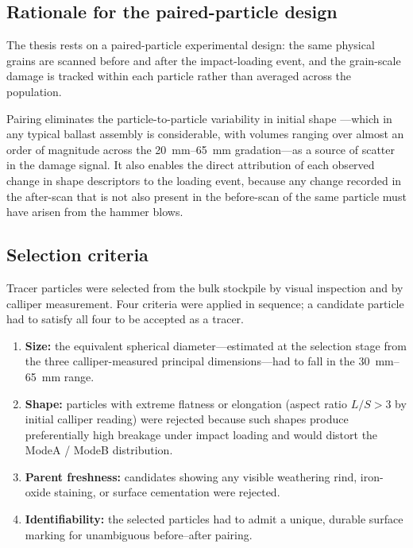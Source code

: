 \subsection{Rationale for the paired-particle design}
\label{sec:meth-paired-rationale}

The thesis rests on a paired-particle experimental design: the same physical
grains are scanned before and after the impact-loading event, and the
grain-scale damage is tracked within each particle rather than averaged
across the population.

\begin{mechanism}[title=Why pair before and after?]
Pairing eliminates the particle-to-particle variability in initial shape
---which in any typical ballast assembly is considerable, with volumes
ranging over almost an order of magnitude across the
\SIrange{20}{65}{\milli\metre} gradation---as a source of scatter in the
damage signal. It also enables the direct attribution of each observed
change in shape descriptors to the loading event, because any change
recorded in the after-scan that is not also present in the before-scan of
the same particle must have arisen from the hammer blows.
\end{mechanism}

\subsection{Selection criteria}
\label{sec:meth-selection}

Tracer particles were selected from the bulk stockpile by visual inspection
and by calliper measurement. Four criteria were applied in sequence; a
candidate particle had to satisfy all four to be accepted as a tracer.

\begin{enumerate}[label=(\roman*),leftmargin=*]
    \item \textbf{Size:} the equivalent spherical diameter---estimated at
          the selection stage from the three calliper-measured principal
          dimensions---had to fall in the
          \SIrange{30}{65}{\milli\metre} range.
    \item \textbf{Shape:} particles with extreme flatness or elongation
          (aspect ratio $L/S>3$ by initial calliper reading) were rejected
          because such shapes produce preferentially high breakage under
          impact loading and would distort the \gls{ModeA} / \gls{ModeB}
          distribution.
    \item \textbf{Parent freshness:} candidates showing any visible
          weathering rind, iron-oxide staining, or surface cementation were
          rejected.
    \item \textbf{Identifiability:} the selected particles had to admit a
          unique, durable surface marking for unambiguous before--after
          pairing.
\end{enumerate}

